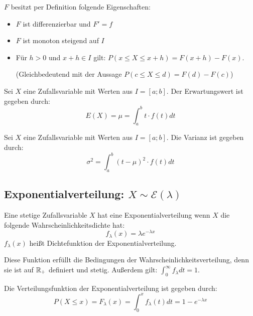 \documentclass[main.tex]{subfiles}
\begin{document}
\begin{Bemerkung}
  $F$ besitzt per Definition folgende Eigenschaften:
  \begin{itemize}
    \item $F$ ist differenzierbar und $F'=f$
    \item $F$ ist monoton steigend auf $I$
    \item Für $h>0$ und $x+h\in I$ gilt: $P(x \leq X \leq x+h) = F(x+h)-F(x)$.
    
    (Gleichbedeutend mit der Aussage $P(c\leq X\leq d)=F(d)-F(c)$)
  \end{itemize}
\end{Bemerkung}

\begin{Definition}[Erwartungswert]
  Sei $X$ eine Zufallsvariable mit Werten aus $I= [a;b]$. Der Erwartungswert ist gegeben durch:
  $$E(X)=\mu=\int_a^b t\cdot f(t)dt$$
\end{Definition}

\begin{Definition}[Varianz]
  Sei $X$ eine Zufallsvariable mit Werten aus $I= [a;b]$. Die Varianz ist gegeben durch:
  $$\sigma^2=\int_a^b (t-\mu)^2 \cdot f(t)dt$$
\end{Definition}


\subsection{Exponentialverteilung: $X \sim \mathcal{E}(\lambda)$}

\begin{Definition}
  Eine stetige Zufallsvariable $X$ hat eine Exponentialverteilung wenn $X$ die folgende Wahrscheinlichkeitsdichte hat:
  $$f_\lambda (x) = \lambda e^{-\lambda x}$$
  $f_\lambda(x)$ heißt Dichtefunktion der Exponentialverteilung.
\end{Definition}

\begin{Bemerkung}
  Diese Funktion erfüllt die Bedingungen der Wahrscheinlichkeitsverteilung, denn sie ist auf $\mathbb{R}_{+}$ definiert und stetig. Außerdem gilt: $\displaystyle \int_0^\infty f_\lambda dt = 1$.
\end{Bemerkung}

\begin{Definition}
  Die Verteilungsfunktion der Exponentialverteilung ist gegeben durch:
  $$P(X \leq x) = F_\lambda(x) = \int_{0}^{x} f_\lambda(t) dt = 1 - e^{-\lambda x}$$
\end{Definition}
\end{document}

